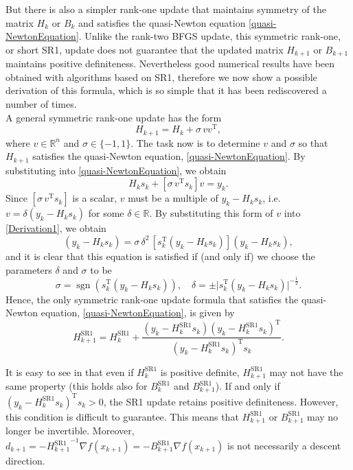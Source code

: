 But there is also a simpler rank-one update that maintains symmetry of the matrix $H_k$ or $B_k$ and satisfies the quasi-Newton equation \cref{quasi-NewtonEquation}. Unlike the rank-two BFGS update, this symmetric rank-one, or short SR1, update does not guarantee that the updated matrix $H_{k+1}$ or $B_{k+1}$ maintains positive definiteness. Nevertheless good numerical results have been obtained with algorithms based on SR1, therefore we now show a possible derivation of this formula, which is so simple that it has been rediscovered a number of times. \\
A general symmetric rank-one update has the form
\begin{equation*}
    H_{k+1} = H_k + \sigma \, v v^{\mathrm{T}},
\end{equation*}
where $v \in \mathbb{R}^n$ and $\sigma \in \{-1,1\}$. The task now is to determine $v$ and $\sigma$ so that $H_{k+1}$ satisfies the quasi-Newton equation, \cref{quasi-NewtonEquation}. By substituting into \cref{quasi-NewtonEquation}, we obtain
\begin{equation}\label{Derivation1}
    H_k s_k + [\sigma \, v^{\mathrm{T}} s_k] v = y_k.
\end{equation}
Since $[\sigma \, v^{\mathrm{T}} s_k]$ is a scalar, $v$ must be a multiple of $y_k − H_k s_k$, i.e. $v = \delta (y_k − H_k s_k)$ for some $\delta \in \mathbb{R}$. By substituting this form of $v$ into \cref{Derivation1}, we obtain
\begin{equation}\label{Derivation2}
    (y_k − H_k s_k) = \sigma \, \delta^2 \, [s^{\mathrm{T}}_k (y_k − H_k s_k)](y_k − H_k s_k),
\end{equation}
and it is clear that this equation is satisfied if (and only if) we choose the parameters $\delta$ and $\sigma$ to be
\begin{equation*}
    \sigma = \operatorname{sgn} (s^{\mathrm{T}}_k (y_k − H_k s_k)), \quad \delta = \pm \lvert s^{\mathrm{T}}_k (y_k − H_k s_k) \rvert^{-\frac{1}{2}}.
\end{equation*}
Hence, the only symmetric rank-one update formula that satisfies the quasi-Newton equation, \cref{quasi-NewtonEquation}, is given by
\begin{equation}\label{directSR1formula}
    H^\mathrm{SR1}_{k+1} = H^\mathrm{SR1}_k + \frac{(y_k - H^\mathrm{SR1}_k s_k) (y_k - H^\mathrm{SR1}_k s_k)^{\mathrm{T}}}{(y_k - H^\mathrm{SR1}_k s_k)^{\mathrm{T}} s_k}.
\end{equation}

It is easy to see in that even if $H^\mathrm{SR1}_k$ is positive definite, $H^\mathrm{SR1}_{k+1}$ may not have the same property (this holds also for $B^\mathrm{SR1}_k$ and $B^\mathrm{SR1}_{k+1}$). If and only if $(y_k - H^\mathrm{SR1}_k s_k)^{\mathrm{T}} s_k > 0$, the SR1 update retains positive definiteness. However, this condition is difficult to guarantee. This means that $H^\mathrm{SR1}_{k+1}$ or $B^\mathrm{SR1}_{k+1}$ may no longer be invertible. Moreover, $d_{k+1} = -{H^\mathrm{SR1}_{k+1}}^{-1} \nabla f(x_{k+1}) = -B^\mathrm{SR1}_{k+1} \nabla f(x_{k+1})$ is not necessarily a descent direction. \\


